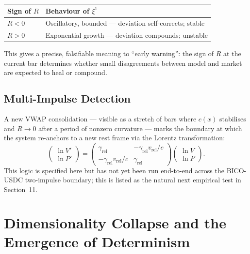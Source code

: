 \documentclass[12pt,a4paper]{article}
\begin{document}
\begin{center}
\begin{tabular}{ll}
\toprule
Sign of $R$ & Behaviour of $\xi^1$ \\
\midrule
$R < 0$ & Oscillatory, bounded --- deviation self-corrects; stable \\
$R > 0$ & Exponential growth --- deviation compounds; unstable \\
\bottomrule
\end{tabular}
\end{center}

This gives a precise, falsifiable meaning to ``early warning'': the sign
of $R$ at the current bar determines whether small disagreements between
model and market are expected to heal or compound.

\subsection{Multi-Impulse Detection}

A new VWAP consolidation --- visible as a stretch of bars where $c(x)$
stabilises and $R\to0$ after a period of nonzero curvature --- marks the
boundary at which the system re-anchors to a new rest frame via the
Lorentz transformation:
\begin{equation}
    \begin{pmatrix}\ln V'\\\ln P'\end{pmatrix} =
    \begin{pmatrix}\gamma_\text{rel} & -\gamma_\text{rel}v_\text{rel}/c \\
    -\gamma_\text{rel}v_\text{rel}/c & \gamma_\text{rel}\end{pmatrix}
    \begin{pmatrix}\ln V\\\ln P\end{pmatrix}.
\end{equation}
This logic is specified here but has not yet been run end-to-end across
the BICO-USDC two-impulse boundary; this is listed as the natural next
empirical test in Section~11.


\section{Dimensionality Collapse and the Emergence of Determinism}
\end{document}
